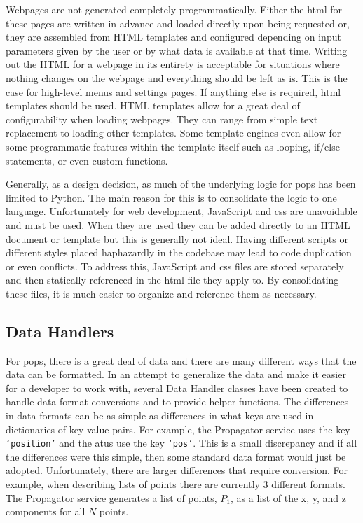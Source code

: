 Webpages are not generated completely programmatically. Either the \gls{html}
for these pages are written in advance and loaded directly upon being requested
or, they are assembled from HTML templates and configured depending on input
parameters given by the user or by what data is available at that time. Writing
out the HTML for a webpage in its entirety is acceptable for situations where
nothing changes on the webpage and everything should be left as is. This is the
case for high-level menus and settings pages. If anything else is required,
\gls{html} templates should be used. HTML templates allow for a great deal of
configurability when loading webpages. They can range from simple text
replacement to loading other templates. Some template engines even allow for
some programmatic features within the template itself such as looping, if/else
statements, or even custom functions.

Generally, as a design decision, as much of the underlying logic for \gls{pops}
has been limited to Python. The main reason for this is to consolidate the
logic to one language. Unfortunately for web development, JavaScript and
\gls{css} are unavoidable and must be used. When they are used they can be
added directly to an HTML document or template but this is generally not ideal.
Having different scripts or different styles placed haphazardly in the codebase
may lead to code duplication or even conflicts. To address this, JavaScript and
\gls{css} files are stored separately and then statically referenced in the
\gls{html} file they apply to.  By consolidating these files, it is much easier
to organize and reference them as necessary. 


\subsection{Data Handlers}\label{sec:data_handler}

For \gls{pops}, there is a great deal of data and there are many different ways
that the data can be formatted. In an attempt to generalize the data and make
it easier for a developer to work with, several Data Handler classes have been
created to handle data format conversions and to provide helper functions.  The
differences in data formats can be as simple as differences in what keys are
used in dictionaries of key-value pairs. For example, the Propagator service
uses the key \texttt{`position'} and the \glspl{atu} use the key
\texttt{`pos'}.  This is a small discrepancy and if all the differences were
this simple, then some standard data format would just be adopted.
Unfortunately, there are larger differences that require conversion. For
example, when describing lists of points there are currently 3 different
formats. The Propagator service generates a list of points, $P_1$, as a list of
the x, y, and z components for all $N$ points. 

